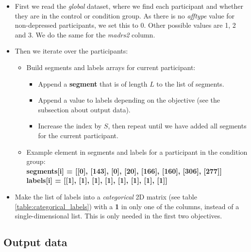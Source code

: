 \begin{itemize}
  \item First we read the \textit{global} dataset, where we find each participant and whether they are in the control or condition group. As there is no \textit{afftype} value for non-depressed participants, we set this to 0. Other possible values are 1, 2 and 3. We do the same for the \textit{madrs2} column.
  \item Then we iterate over the participants:

  \begin{itemize}
    \item Build segments and labels arrays for current participant:
    \begin{itemize}
      \item Append a \textbf{segment} that is of length $L$ to the list of segments. 
      \item Append a value to labels depending on the objective (see the subsection about output data).
      \item Increase the index by $S$, then repeat until we have added all segments for the current participant.
    \end{itemize}
    \item Example element in segments and labels for a participant in the condition group: \\
    \textbf{segments[i] = [[0], [143], [0], [20], [166], [160], [306], [277]]}\\
    \textbf{labels[i] = [[1], [1], [1], [1], [1], [1], [1], [1]]}
  \end{itemize}
  
  \item Make the list of labels into a \textit{categorical} 2D matrix (see table \ref{table:categorical_labels}) with a \textbf{1} in only one of the columns, instead of a single-dimensional list. This is only needed in the first two objectives.
\end{itemize}

\subsection{Output data}

